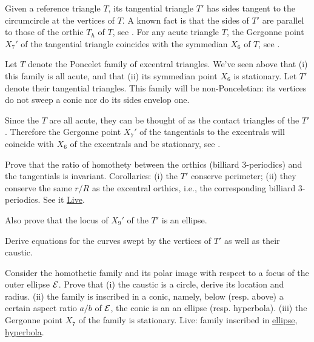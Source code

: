 \begin{question}
Given a reference triangle $T$, its tangential triangle $T'$ has sides tangent to the circumcircle at the vertices of $T$. A known fact is that the sides of $T'$ are parallel to those of the orthic $T_h$ of $T$, see \cite[Tangential Triangle]{mw}. For any acute triangle $T$, the Gergonne point $X_7'$ of the tangential triangle coincides with the symmedian $X_6$ of $T$, see \cite[Contact Triangle]{mw}.

Let $T$ denote the Poncelet family of excentral triangles. We've seen above that (i) this family is all acute, and that (ii) its symmedian point $X_6$ is stationary. Let $T'$ denote their tangential triangles. This family will be non-Ponceletian: its vertices do not sweep a conic nor do its sides envelop one.

Since the $T$ are all acute, they can be thought of as the contact triangles of the $T'$. Therefore the Gergonne point $X_7'$ of the tangentials to the excentrals will coincide with $X_6$ of the excentrals and be stationary, see \cite[Contact Triangle]{mw}.

Prove that the ratio of homothety between the orthics (billiard 3-periodics) and the tangentials is invariant. Corollaries: (i) the $T'$ conserve perimeter; (ii) they conserve the same $r/R$ as the excentral orthics, i.e., the corresponding billiard 3-periodics. See it \href{https://bit.ly/3o7JM8V}{Live}.

Also prove that the locus of $X_9'$ of the $T'$ is an ellipse.

Derive equations for the curves swept by the vertices of $T'$ as well as their caustic. 
\end{question}

\begin{question}
Consider the homothetic family and its polar image with respect to a focus of the outer ellipse $\mathcal{E}$. Prove that (i) the caustic is a circle, derive its location and radius. (ii) the family is inscribed in a conic, namely, below (resp. above) a certain aspect ratio $a/b$ of $\mathcal{E}$, the conic is an an ellipse (resp. hyperbola). (iii) the Gergonne point $X_7$ of the family is stationary.
Live: family inscribed in \href{https://bit.ly/33p7xj6}{ellipse}, \href{https://bit.ly/3bbTaTt}{hyperbola}.
\end{question}